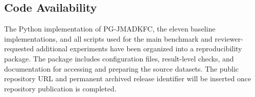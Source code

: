 \subsection*{Code Availability}
The Python implementation of PG-JMADKFC, the eleven baseline implementations, and all scripts used for the main benchmark and reviewer-requested additional experiments have been organized into a reproducibility package. The package includes configuration files, result-level checks, and documentation for accessing and preparing the source datasets. The public repository URL and permanent archived release identifier will be inserted once repository publication is completed.
